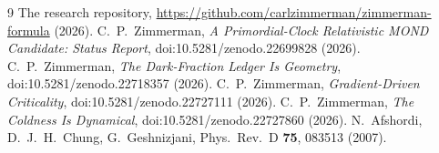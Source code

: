 \documentclass[11pt,letterpaper]{article}
\begin{document}
\begin{thebibliography}{9}
 The research repository, \url{https://github.com/carlzimmerman/zimmerman-formula} (2026).
 C.~P.~Zimmerman, \emph{A Primordial-Clock Relativistic MOND Candidate: Status Report}, doi:10.5281/zenodo.22699828 (2026).
 C.~P.~Zimmerman, \emph{The Dark-Fraction Ledger Is Geometry}, doi:10.5281/zenodo.22718357 (2026).
 C.~P.~Zimmerman, \emph{Gradient-Driven Criticality}, doi:10.5281/zenodo.22727111 (2026).
 C.~P.~Zimmerman, \emph{The Coldness Is Dynamical}, doi:10.5281/zenodo.22727860 (2026).
 N.~Afshordi, D.~J.~H.~Chung, G.~Geshnizjani, Phys.\ Rev.\ D \textbf{75}, 083513 (2007).
\end{thebibliography}
\end{document}
